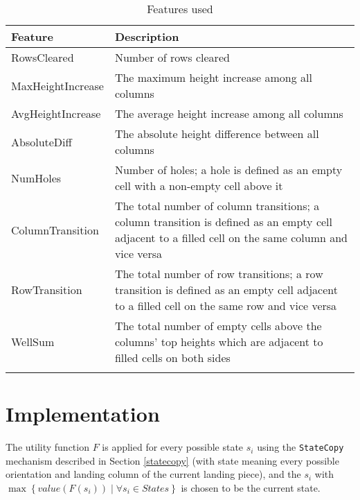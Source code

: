 \documentclass[12pt]{article}
\numberwithin{table}{section}
\begin{document}
\begin{longtable}[H]{|p{4cm}|p{11.2cm}|}
\hline
\textbf{Feature}  & \textbf{Description}                                                                                                                                \\ \hline
RowsCleared       & Number of rows cleared                                                                                                                              \\ \hline
MaxHeightIncrease & The maximum height increase among all columns                                                                                                       \\ \hline
AvgHeightIncrease & The average height increase among all columns                                                                                                       \\ \hline
AbsoluteDiff      & The absolute height difference between all columns                                                                                                  \\ \hline
NumHoles          & Number of holes; a hole is defined as an empty cell with a non-empty cell above it                                                                  \\ \hline
ColumnTransition  & The total number of column transitions; a column transition is defined as an empty cell adjacent to a filled cell on the same column and vice versa \\ \hline
RowTransition     & The total number of row transitions; a row transition is defined as an empty cell adjacent to a filled cell on the same row and vice versa          \\ \hline
WellSum           & The total number of empty cells above the columns' top heights which are adjacent to filled cells on both sides                                     \\ \hline
\caption{Features used}
\label{featurestable}
\end{longtable}

\section{Implementation}
The utility function $F$ is applied for every possible state $s_i$ using the \texttt{StateCopy} mechanism described in Section \ref{statecopy} (with state meaning every possible orientation and landing column of the current landing piece), and the $s_i$ with $\max \left\lbrace value(F(s_i)) \mid \forall s_i\in States\right\rbrace$ is chosen to be the current state.
\end{document}
